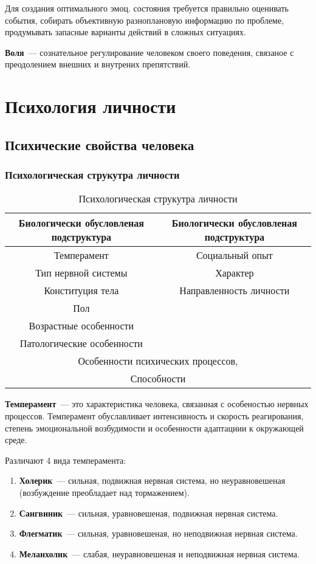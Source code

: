 Для создания оптимального эмоц. состояния требуется правильно оценивать события, собирать объективную разноплановую информацию по проблеме, продумывать запасные варианты действий в сложных ситуациях.

\textbf{Воля}~--- сознательное регулирование человеком своего поведения, связаное с преодолением внешних и внутрених препятствий.

\section{Психология личности}
\subsection{Психические свойства человека}
\subsubsection{Психологическая струкутра личности}
\begin{table}
\begin{tabular}{|c|c|}
	Биологически обусловленая подструктура & Биологически обусловленая подструктура\\
	\hline
	Темперамент & Социальный опыт\\
	Тип нервной системы & Характер\\
	Конституция тела & Направленность личности\\
	Пол & \\
	Возрастные особенности & \\
	Патологические особенности & \\
	\hline
	\multicolumn{2}{|c|}{Особенности психических процессов,}\\
	\multicolumn{2}{|c|}{Способности}\\
	\hline
\end{tabular}
\caption{Психологическая струкутра личности}
\end{table}

\textbf{Темперамент}~--- это характеристика человека, связанная с особеностью нервных процессов. Темперамент обуславливает интенсивность и скорость реагирования, степень эмоциональной возбудимости и особенности адаптациии к окружающей среде.

Различают 4 вида темперамента:
\begin{enumerate}
	\item \textbf{Холерик}~--- сильная, подвижная нервная система, но неуравновешеная (возбуждение преобладает над тормажением).
	\item \textbf{Сангвиник}~--- сильная, уравновешеная, подвижная нервная система.
	\item \textbf{Флегматик}~--- сильная, уравновешеная, но неподвижная нервная система.
	\item \textbf{Меланхолик}~--- слабая, неуравновешеная и неподвижная нервная система.
\end{enumerate}

